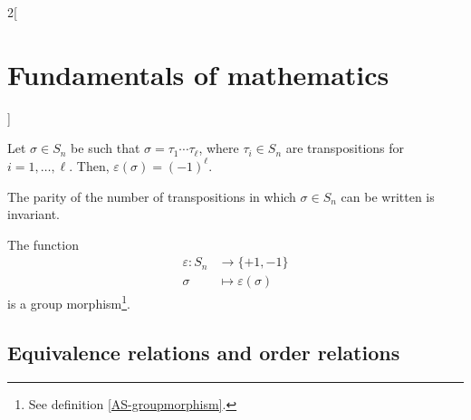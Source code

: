 \documentclass[../../../main.tex]{subfiles}
\begin{document}
\begin{multicols}{2}[\section{Fundamentals of mathematics}]
\begin{theorem}
\end{theorem}
\begin{corollary}
    Let $\sigma\in S_n$ be such that $\sigma=\tau_1\cdots\tau_\ell$, where $\tau_i\in S_n$ are transpositions for $i=1,\ldots,\ell$. Then, $\varepsilon(\sigma)=(-1)^\ell$.
\end{corollary}
\begin{corollary}
    The parity of the number of transpositions in which $\sigma\in S_n$ can be written is invariant.
\end{corollary}
\begin{corollary}
    The function
    \begin{align*}
        \varepsilon:S_n&\longrightarrow\{+1,-1\}\\
        \sigma&\longmapsto\varepsilon(\sigma)
    \end{align*}
    is a group morphism\footnote{See definition \ref{AS-groupmorphism}.}.
\end{corollary}
\subsection{Equivalence relations and order relations}

\end{multicols}
\end{document}

